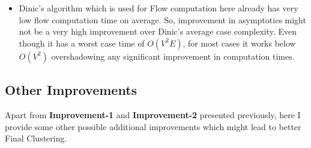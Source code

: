 \begin{enumerate}
{\begin{itemize}
{                            Because, if two adjacent nodes sharing an edge are condensed into a single node then bipartiteness property will be broken. Also, since the Condensations are constrained, this also results in lower Node condesations. So overall, this method even though has better worst case time might lead to worse overall execution time due to lower Node/Edge Condensations.
                        }
                        \item {
                            Dinic's algorithm which is used for Flow computation here already has very low flow computation time on average. So, improvement in asymptotics might not be a very high improvement over Dinic's average case complexity. Even though it has a worst case time of $O(V^2E)$, for most cases it works below $O(V^2)$ overshadowing any significant improvement in computation times.
                        }
                    \end{itemize}
                }
            \end{enumerate}

        \subsection{Other Improvements}
            Apart from \textbf{Improvement-1} and \textbf{Improvement-2} presented previously, here I provide some other possible additional improvements which might lead to better Final Clustering.

